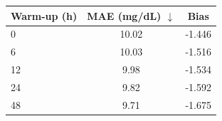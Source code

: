 \begin{tabular}{lcc}
\toprule
Warm-up (h) & MAE (mg/dL) $\downarrow$ & Bias \\
\midrule
0 & 10.02 & -1.446 \\
6 & 10.03 & -1.516 \\
12 & 9.98 & -1.534 \\
24 & 9.82 & -1.592 \\
48 & 9.71 & -1.675 \\
\bottomrule
\end{tabular}
